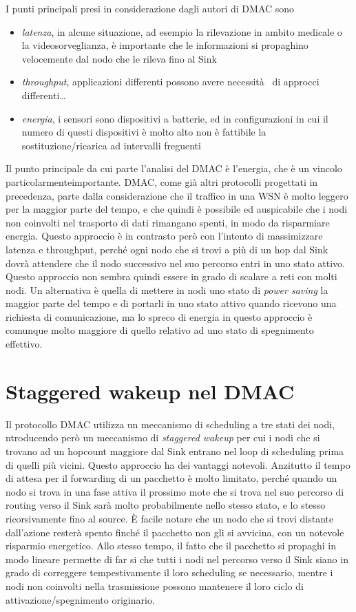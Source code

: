 \documentclass[pdftex,11pt,a4paper,italian]{book}
\begin{document}
I punti principali presi in considerazione dagli autori di DMAC sono
\begin{itemize}

\item \emph{latenza}, in alcune situazione, ad esempio la rilevazione in ambito medicale o 
la videosorveglianza, è importante che le informazioni si propaghino velocemente dal nodo che le 
rileva fino al Sink
\item \emph{throughput}, applicazioni differenti possono avere necessità  di approcci differenti\ldots

\item \emph{energia}, i sensori sono dispositivi a batterie, ed in configurazioni in cui il 
numero di questi dispositivi è molto alto non è fattibile la sostituzione/ricarica ad 
intervalli freguenti

\end{itemize}

Il punto principale da cui parte l'analisi del DMAC è l'energia, che è un vincolo particolarmenteimportante. DMAC, come già altri protocolli progettati in precedenza, parte dalla 
considerazione che il traffico in una WSN è molto leggero per la maggior parte del tempo, e 
che quindi è 
possibile ed auspicabile che i nodi non coinvolti nel trasporto di dati rimangano spenti, 
in modo da risparmiare energia. 
Questo approccio è in contrasto però con l'intento di massimizzare latenza e throughput, 
perché ogni nodo che si trovi a più di un hop dal Sink dovrà attendere che il nodo successivo 
nel suo percorso entri in uno stato attivo. Questo approccio non sembra quindi essere in grado 
di scalare a reti con molti nodi. 
Un alternativa è quella di mettere in nodi uno stato di \emph{power saving} la 
maggior parte del tempo e di portarli in uno stato attivo quando ricevono una richiesta di 
comunicazione, ma lo spreco di energia in questo approccio è comunque molto maggiore di quello 
relativo ad uno stato di spegnimento effettivo. 
\section{Staggered wakeup nel DMAC}
Il protocollo DMAC utilizza un meccanismo di scheduling a tre stati dei nodi, 
ntroducendo però un meccanismo di \emph{staggered wakeup} per cui i nodi che si trovano ad un 
hopcount maggiore dal Sink entrano nel loop di scheduling prima di quelli più vicini.
Questo approccio ha dei vantaggi notevoli. Anzitutto il tempo di attesa per il forwarding di un pacchetto è molto limitato, perché quando un nodo si trova in una fase attiva il prossimo mote 
che si trova nel suo percorso di routing verso il Sink sarà molto probabilmente nello stesso 
stato, e lo stesso ricorsivamente fino al source. 
\`E facile notare che un nodo che si trovi distante dall'azione resterà spento finché il 
pacchetto non gli si avvicina, con un notevole risparmio energetico.
Allo stesso tempo, il fatto che il pacchetto si propaghi in modo lineare permette di far si che 
tutti i nodi nel percorso verso il Sink siano in grado di correggere tempestivamente il loro 
scheduling se necessario, mentre i nodi non coinvolti nella trasmissione possono mantenere il 
loro ciclo di attivazione/spegnimento originario. 
\end{document}
